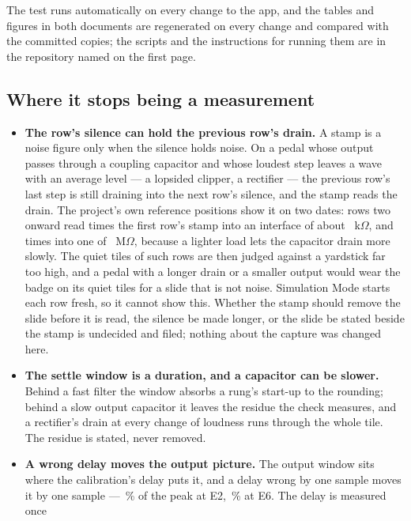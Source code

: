 \documentclass[11pt,a4paper]{article}
\begin{document}
The test runs automatically on every change to the app, and the tables
and figures in both documents are regenerated on every change and
compared with the committed copies; the scripts and the instructions for
running them are in the repository named on the first page.

\subsection{Where it stops being a measurement}

\begin{itemize}
  \item \textbf{The row's silence can hold the previous row's drain.} A
  stamp is a noise figure only when the silence holds noise. On a pedal
  whose output passes through a coupling capacitor and whose loudest step
  leaves a wave with an average level --- a lopsided clipper, a rectifier
  --- the previous row's last step is still draining into the next row's
  silence, and the stamp reads the drain. The project's own reference
  positions show it on two dates: rows two onward read
  \wmLibraryTailLowLoad{} times the first row's stamp into an interface
  of about \wmLibraryLowLoadKOhm~k$\Omega$, and \wmLibraryTailHighLoad{}
  times into one of \wmLibraryHighLoadMOhm~M$\Omega$, because a lighter
  load lets the capacitor drain more slowly. The quiet tiles of such rows
  are then judged against a yardstick far too high, and a pedal with a
  longer drain or a smaller output would wear the badge on its quiet
  tiles for a slide that is not noise. Simulation Mode starts each row
  fresh, so it cannot show this. Whether the stamp should remove the
  slide before it is read, the silence be made longer, or the slide be
  stated beside the stamp is undecided and filed; nothing about the
  capture was changed here.
  \item \textbf{The settle window is a duration, and a capacitor can be
  slower.} Behind a fast filter the window absorbs a rung's start-up to
  the rounding; behind a slow output capacitor it leaves the residue the
  check measures, and a rectifier's drain at every change of loudness
  runs through the whole tile. The residue is stated, never removed.
  \item \textbf{A wrong delay moves the output picture.} The output
  window sits where the calibration's delay puts it, and a delay wrong by
  one sample moves it by one sample --- \mparityMiscutLow{}\,\% of the
  peak at E2, \mparityMiscutHigh{}\,\% at E6. The delay is measured once

\end{itemize}
\end{document}
